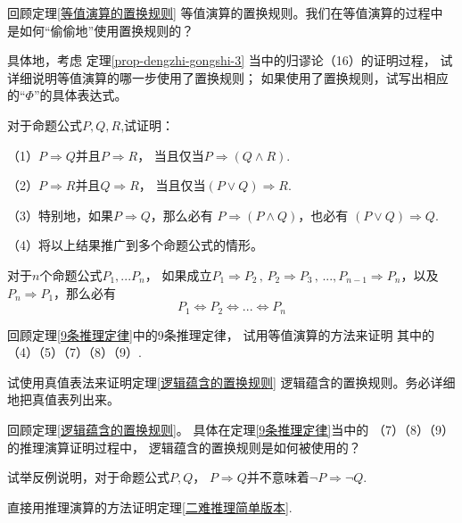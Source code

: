 \begin{prob}[关于等值演算的置换规则]
回顾定理\ref{等值演算的置换规则}
等值演算的置换规则。我们在等值演算的过程中
是如何“偷偷地”使用置换规则的？

具体地，考虑
定理\ref{prop-dengzhi-gongshi-3}
当中的归谬论（16）的证明过程，
试详细说明等值演算的哪一步使用了置换规则；
如果使用了置换规则，试写出相应的“$\Phi$”的具体表达式。
\end{prob}\vs

\begin{prob}对于命题公式$P,Q,R$,试证明：

（1）$P\Rightarrow Q$并且$P\Rightarrow R$，
当且仅当$P\Rightarrow(Q\wedge R)$.

（2）$P\Rightarrow R$并且$Q\Rightarrow R$，
当且仅当$(P\vee Q)\Rightarrow R$.

（3）特别地，如果$P\Rightarrow Q$，那么必有
$P\Rightarrow(P\wedge Q)$，也必有
$(P\vee Q)\Rightarrow Q$.

（4）将以上结果推广到多个命题公式的情形。
\end{prob}\vs

\begin{prob}[循环论证]
对于$n$个命题公式$P_1,...P_n$，
如果成立$P_1\Rightarrow P_2\,,\,P_2\Rightarrow P_3\,,\,...,
P_{n-1}\Rightarrow P_n$，以及$P_n\Rightarrow P_1$，那么必有
$$P_1\Leftrightarrow P_2
\Leftrightarrow...\Leftrightarrow P_n$$
\end{prob}\vs

\begin{prob}[基本推理定律的验证]
回顾定理\ref{9条推理定律}中的9条推理定律，
试用等值演算的方法来证明
其中的（4）（5）（7）（8）（9）.
\end{prob}\vs

\begin{prob}[真值表法的尝试]
试使用真值表法来证明定理\ref{逻辑蕴含的置换规则}
逻辑蕴含的置换规则。务必详细地把真值表列出来。
\end{prob}\vs

\begin{prob}[逻辑蕴含的置换规则的使用]
回顾定理\ref{逻辑蕴含的置换规则}。
具体在定理\ref{9条推理定律}当中的
（7）（8）（9）的推理演算证明过程中，
逻辑蕴含的置换规则是如何被使用的？
\end{prob}\vs

\begin{prob}试举反例说明，对于命题公式$P,Q$，
$P\Rightarrow Q$并不意味着$\neg P\Rightarrow \neg Q$.
\end{prob}\vs

\begin{prob}[二难推理简单版本]
直接用推理演算的方法证明定理\ref{二难推理简单版本}.
\end{prob}\vs


